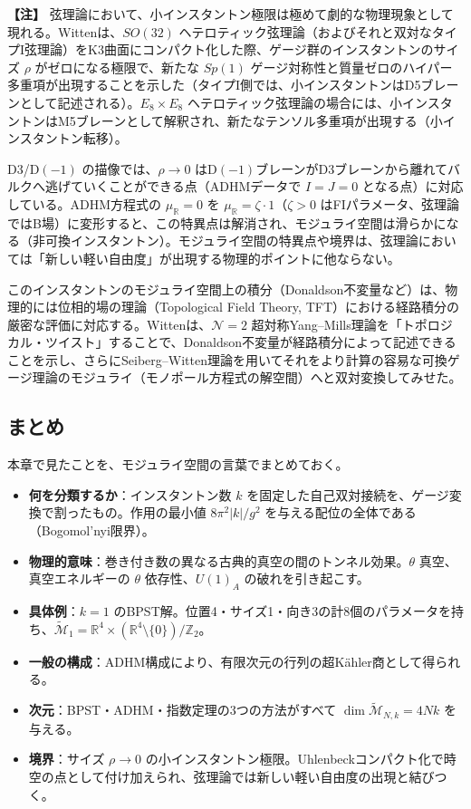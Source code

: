 \documentclass[uplatex, dvipdfmx, book]{jsbook}
\let\origsubsection\subsection
\let\origsubsubsection\subsubsection
\renewcommand{\section}{\origsubsection}
\renewcommand{\subsection}{\origsubsubsection}
\renewcommand{\subsubsection}{\paragraph}
\newenvironment{note}{\vspace{1ex}\par\footnotesize\noindent\textbf{【注】}}{\par\vspace{1ex}}
\begin{document}
\begin{note}
弦理論において、小インスタントン極限は極めて劇的な物理現象として現れる。Witten\cite{witten1996small}は、$SO(32)$ ヘテロティック弦理論（およびそれと双対なタイプI弦理論）をK3曲面にコンパクト化した際、ゲージ群のインスタントンのサイズ $\rho$ がゼロになる極限で、新たな $Sp(1)$ ゲージ対称性と質量ゼロのハイパー多重項が出現することを示した（タイプI側では、小インスタントンはD5ブレーンとして記述される）。$E_8 \times E_8$ ヘテロティック弦理論の場合には、小インスタントンはM5ブレーンとして解釈され、新たなテンソル多重項が出現する（小インスタントン転移）。

D3/D$(-1)$ の描像では、$\rho \to 0$ はD$(-1)$ブレーンがD3ブレーンから離れてバルクへ逃げていくことができる点（ADHMデータで $I = J = 0$ となる点）に対応している。ADHM方程式の $\mu_{\mathbb{R}} = 0$ を $\mu_{\mathbb{R}} = \zeta \cdot 1$（$\zeta > 0$ はFIパラメータ、弦理論ではB場）に変形すると、この特異点は解消され、モジュライ空間は滑らかになる（非可換インスタントン）。モジュライ空間の特異点や境界は、弦理論においては「新しい軽い自由度」が出現する物理的ポイントに他ならない。
\end{note}

このインスタントンのモジュライ空間上の積分（Donaldson不変量など）は、物理的には位相的場の理論（Topological Field Theory, TFT）における経路積分の厳密な評価に対応する。Wittenは、$\mathcal{N}=2$ 超対称Yang--Mills理論を「トポロジカル・ツイスト」することで、Donaldson不変量が経路積分によって記述できることを示し、さらにSeiberg--Witten理論\cite{seibergwitten1994}を用いてそれをより計算の容易な可換ゲージ理論のモジュライ（モノポール方程式の解空間）へと双対変換してみせた。

\section{まとめ}

本章で見たことを、モジュライ空間の言葉でまとめておく。
\begin{itemize}
    \item \textbf{何を分類するか}：インスタントン数 $k$ を固定した自己双対接続を、ゲージ変換で割ったもの。作用の最小値 $8\pi^2|k|/g^2$ を与える配位の全体である（Bogomol'nyi限界）。
    \item \textbf{物理的意味}：巻き付き数の異なる古典的真空の間のトンネル効果。$\theta$ 真空、真空エネルギーの $\theta$ 依存性、$U(1)_A$ の破れを引き起こす。
    \item \textbf{具体例}：$k = 1$ のBPST解。位置4・サイズ1・向き3の計8個のパラメータを持ち、$\widetilde{\mathcal{M}}_1 = \mathbb{R}^4 \times (\mathbb{R}^4\setminus\{0\})/\mathbb{Z}_2$。
    \item \textbf{一般の構成}：ADHM構成により、有限次元の行列の超K\"ahler商として得られる。
    \item \textbf{次元}：BPST・ADHM・指数定理の3つの方法がすべて $\dim \widetilde{\mathcal{M}}_{N,k} = 4Nk$ を与える。
    \item \textbf{境界}：サイズ $\rho \to 0$ の小インスタントン極限。Uhlenbeckコンパクト化で時空の点として付け加えられ、弦理論では新しい軽い自由度の出現と結びつく。
\end{itemize}
\end{document}

